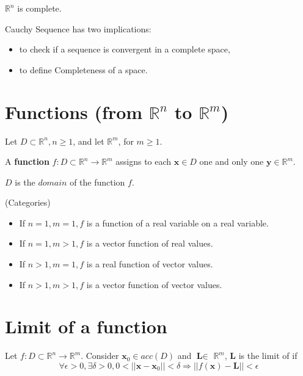 \begin{proposition}
    $\mathbb{R}^{n}$ is complete.
\end{proposition}

\begin{remark*}
    Cauchy Sequence has two implications:
    \begin{itemize}
        \item to check if a sequence is convergent in a complete space,
        \item to define Completeness of a space.
    \end{itemize}
\end{remark*}


\section{Functions (from $\mathbb{R}^{n}$ to $\mathbb{R}^{m}$)}

\begin{definition}
    Let  $D \subset \mathbb{R}^{n}, n \geq 1$, and let  $\mathbb{R}^{m}$, for  $m \geq 1$.

    A \textbf{function} $f:D \subset \mathbb{R}^{n} \to \mathbb{R}^{m}$ assigns to each $\mathbf{x} \in D$ one and only one $\mathbf{y} \in \mathbb{R}^{m}$.

    $D$ is the $domain$ of the function $f$.
\end{definition}

\begin{remark*} (Categories)
    \begin{itemize}
        \item
              If \(n = 1, m = 1, f\) is a function of a real variable on a real
              variable.
        \item
              If \(n = 1, m > 1, f\) is a vector function of real values.
        \item
              If \(n > 1, m = 1, f\) is a real function of vector values.
        \item
              If \(n > 1, m > 1, f\) is a vector function of vector values.
    \end{itemize}
\end{remark*}

\section{Limit of a function}

\begin{definition}[Limits]
    Let $f: D \subset \mathbb{R}^{n} \to \mathbb{R}^{m}$. Consider
    \(\mathbf{x}_{0}\in a c c(D)\) and \(\textbf{L}\in\) \(\mathbb{R}^{m}\), $\mathbf{L}$ is the limit of if \begin{equation*}
        \forall \epsilon > 0, \exists \delta > 0, 0<||\mathbf{x} - \mathbf{x}_{0}|| < \delta \Rightarrow \left|\left|f(\mathbf{x}) - \mathbf{L}\right|\right|< \epsilon
    \end{equation*}
\end{definition}

